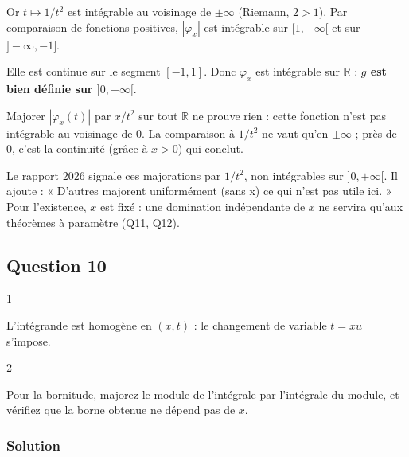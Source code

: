 \documentclass[11pt,a4paper]{article}
\newcommand{\equationajustee}[1]{%
  \sbox{\boiteequation}{$\displaystyle #1$}%
  \ifdim\wd\boiteequation>\linewidth
    \[\resizebox{\linewidth}{!}{\usebox{\boiteequation}}\]%
  \else
    \[#1\]%
  \fi}
\begin{document}
\equationajustee{|\varphi_x(t)|=\frac{x}{x^2+t^2}\underset{|t|\to+\infty}{\sim}\frac{x}{t^2}.}

Or \(t\mapsto1/t^2\) est intégrable au voisinage de \(\pm\infty\) (Riemann, \(2>1\)). Par comparaison de fonctions positives, \(|\varphi_x|\) est intégrable sur \([1,+\infty[\) et sur \(]-\infty,-1]\).

Elle est continue sur le segment \([-1,1]\). Donc \(\varphi_x\) est intégrable sur \(\mathbb{R}\) : \textbf{\(g\) est bien définie sur \(]0,+\infty[\)}.

\begin{piege}

Majorer \(|\varphi_x(t)|\) par \(x/t^2\) sur tout \(\mathbb{R}\) ne prouve rien : cette fonction n'est pas intégrable au voisinage de 0. La comparaison à \(1/t^2\) ne vaut qu'en \(\pm\infty\) ; près de 0, c'est la continuité (grâce à \(x>0\)) qui conclut.

\end{piege}

\begin{jury}

Le rapport 2026 signale ces majorations par \(1/t^2\), non intégrables sur \(]0,+\infty[\). Il ajoute : « D'autres majorent uniformément (sans x) ce qui n'est pas utile ici. » Pour l'existence, \(x\) est fixé : une domination indépendante de \(x\) ne servira qu'aux théorèmes à paramètre (Q11, Q12).

\end{jury}

\hypertarget{question-10}{%
\subsection{Question 10}\label{question-10}}

\begin{indication}{1}

L'intégrande est homogène en \((x,t)\) : le changement de variable \(t=xu\) s'impose.

\end{indication}

\begin{indication}{2}

Pour la bornitude, majorez le module de l'intégrale par l'intégrale du module, et vérifiez que la borne obtenue ne dépend pas de \(x\).

\end{indication}

\hypertarget{solution-9}{%
\subsubsection{Solution}\label{solution-9}}
\end{document}
